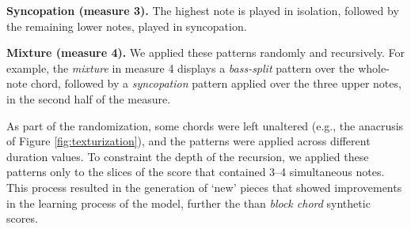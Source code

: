 \textbf{Syncopation (measure 3).} The highest note is played in isolation, followed by the remaining lower notes, played in syncopation.

\textbf{Mixture (measure 4).} We applied these patterns randomly and recursively. For example, the \emph{mixture} in measure 4 displays a \emph{bass-split} pattern over the whole-note chord, followed by a \emph{syncopation} pattern applied over the three upper notes, in the second half of the measure. 

As part of the randomization, some chords were left unaltered (e.g., the anacrusis of Figure \ref{fig:texturization}), and the patterns were applied across different duration values. 
To constraint the depth of the recursion, we applied these patterns only to the slices of the score that contained 3--4 simultaneous notes.  
This process resulted in the generation of `new' pieces that showed improvements in the learning process of the model, further the than \emph{block chord} synthetic scores.

